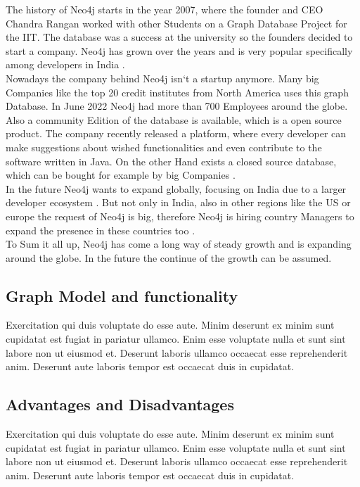 The history of Neo4j starts in the year 2007, where the founder and CEO Chandra Rangan worked with other Students on a Graph Database Project for the \acs{IIT}. The database was a success at the university so the founders
decided to start a company. Neo4j has grown over the years and is very popular specifically among developers in India \cite{historyneo4j}.\\
Nowadays the company behind Neo4j isn`t a startup anymore. Many big Companies like the top 20 credit institutes from North America uses this graph Database.  In June 2022 Neo4j had more than 700 Employees around the globe.
Also a community Edition of the database is available, which is a open source product. The company recently released a platform, where every developer can make suggestions about wished functionalities and even contribute
to the software written in Java. On the other Hand exists a closed source database, which can be bought for example by big Companies \cite{historyneo4j}.\\
In the future Neo4j wants to expand globally, focusing on India due to \glqq  a larger developer ecosystem \grqq{} \cite{historyneo4j}. But not only in India, also in other regions like the US or europe the request 
of Neo4j is big, therefore Neo4j is hiring country Managers to expand the presence in these countries too \cite{historyneo4j}.\\
To Sum it all up, Neo4j has come a long way of steady growth and is expanding around the globe. In the future the continue of the growth can be assumed.

\subsection{Graph Model and functionality} \label{subsec:graphModelFunctionalityNeo4j}

Exercitation qui duis voluptate do esse aute. Minim deserunt ex minim sunt cupidatat est fugiat in pariatur ullamco. Enim esse voluptate nulla et sunt sint labore non ut eiusmod et. Deserunt laboris ullamco occaecat esse reprehenderit anim. Deserunt aute laboris tempor est occaecat duis in cupidatat.

\subsection{Advantages and Disadvantages} \label{subsec:advantagesDisadvantagesNeo4j}

Exercitation qui duis voluptate do esse aute. Minim deserunt ex minim sunt cupidatat est fugiat in pariatur ullamco. Enim esse voluptate nulla et sunt sint labore non ut eiusmod et. Deserunt laboris ullamco occaecat esse reprehenderit anim. Deserunt aute laboris tempor est occaecat duis in cupidatat.

